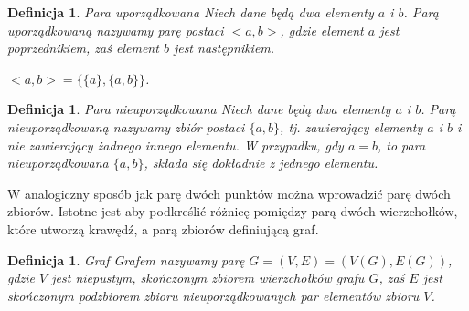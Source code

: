 \documentclass[12pt,a4paper]{report}
\newtheorem{definition}[theorem]{Definicja}
\begin{document}


\begin{definition}{Para uporządkowana \cite[w oparciu o rozdział 3]{kuratowski2004}}
Niech dane będą dwa elementy $a$ i $b$. Parą uporządkowaną nazywamy parę postaci $<a,b>$, gdzie element $a$ jest poprzednikiem, zaś element $b$ jest następnikiem. 

$<a,b>=\{\{a\},\{a,b\}\}$.

\end{definition}

\begin{definition}{Para nieuporządkowana \cite[w oparciu o rozdział 3]{kuratowski2004}}
Niech dane będą dwa elementy $a$ i $b$. Parą nieuporządkowaną nazywamy zbiór postaci $\{a,b\}$, tj. zawierający elementy $a$ i $b$ i nie zawierający żadnego innego elementu. W przypadku, gdy $a=b$, to para nieuporządkowana $\{a,b\}$, składa się dokładnie z jednego elementu.
\end{definition}

W analogiczny sposób jak parę dwóch punktów można wprowadzić parę dwóch zbiorów. Istotne jest aby podkreślić różnicę pomiędzy parą dwóch wierzchołków, które utworzą krawędź, a parą zbiorów definiującą graf. 


\begin{definition}{Graf \cite[w oparciu o rozdział 2]{wilson2008}}
Grafem nazywamy parę $G=(V,E)=(V(G),E(G))$, gdzie $V$ jest niepustym, skończonym zbiorem wierzchołków grafu $G$, zaś $E$ jest skończonym podzbiorem zbioru nieuporządkowanych par elementów zbioru $V$.
\end{definition}
\end{document}
